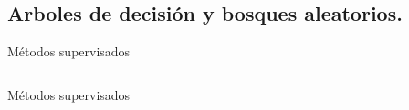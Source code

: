 \subsection{Arboles de decisión y bosques aleatorios.}
\begin{frame}{Métodos supervisados}
\begin{columns}
\begin{column}{0.9\textwidth}

\end{column}
\end{columns}
\end{frame}

\begin{frame}{Métodos supervisados}
\begin{columns}
\begin{column}{0.9\textwidth}

\end{column}
\end{columns}
\end{frame}
